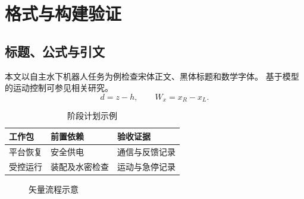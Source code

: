 \chapter{格式与构建验证}
\section{标题、公式与引文}
本文以自主水下机器人任务为例检查宋体正文、黑体标题和数学字体。
基于模型的运动控制可参见相关研究\cite{hewing2020learning}。
\begin{equation}d=z-h,\qquad W_x=x_R-x_L.\end{equation}
\begin{table}[htbp]\centering\caption{阶段计划示例}
\begin{tabular}{lll}\toprule 工作包&前置依赖&验收证据\\\midrule
平台恢复&安全供电&通信与反馈记录\\
受控运行&装配及水密检查&运动与急停记录\\\bottomrule\end{tabular}\end{table}
\begin{figure}[htbp]\centering
{}
\caption{矢量流程示意}\end{figure}
